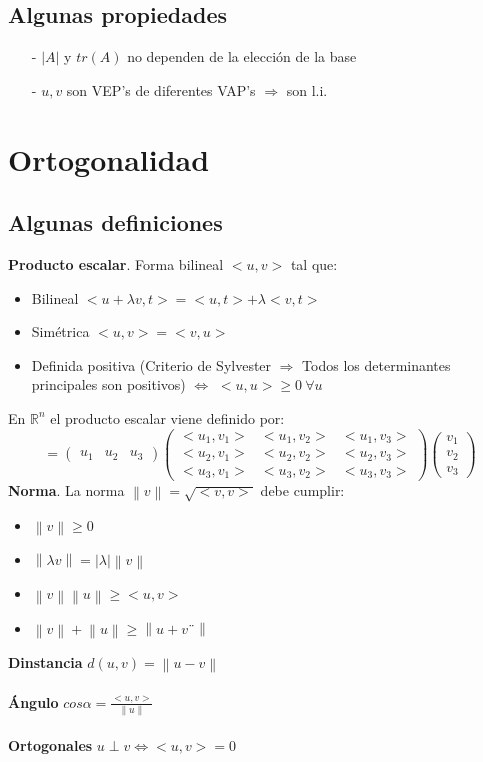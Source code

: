 \documentclass[12pt]{article}
\newcommand\norm[1]{\left\lVert#1\right\rVert}
\begin{document}
	\subsection{Algunas propiedades}
	\begin{itemize}
		\item[-] $|A|$ y $tr(A)$ no dependen de la elección de la base
		\item[-] $u, v$ son VEP's de diferentes VAP's $\Rightarrow$ son l.i.
	\end{itemize}
	
	
\section{Ortogonalidad}
	\subsection{Algunas definiciones}
	\textbf{Producto escalar}. Forma bilineal $<u, v>$ tal que:
	\begin{itemize}
		\item Bilineal $<u+\lambda v, t> = <u, t> + \lambda <v, t>$
		\item Simétrica $<u, v>=<v, u>$
		\item Definida positiva (Criterio de Sylvester $\Rightarrow$ Todos los determinantes principales son positivos) $\iff$ $<u, u> \geq 0 \ \forall u$
	\end{itemize}
	
	
	En $\mathbb{R}^n$ el producto escalar viene definido por:
	\[<u, v>= \begin{pmatrix} 
    u_1 & u_2 & u_3
	\end{pmatrix}
	\begin{pmatrix} 
	<u_1, v_1> & <u_1, v_2> & <u_1, v_3> \\
    <u_2, v_1> & <u_2, v_2> & <u_2, v_3> \\
    <u_3, v_1> & <u_3, v_2> & <u_3, v_3> 
    \end{pmatrix}
	\begin{pmatrix} 
	v_1 \\
	v_2 \\
	v_3
	\end{pmatrix}
	\]
	\textbf{Norma}. La norma $\norm{v}=\sqrt{<v, v>}$ debe cumplir:
	\begin{itemize}
		\item $\norm{v}\geq 0$
		\item $\norm{\lambda v} = |\lambda|\norm{v}$
		\item $\norm{v}\norm{u} \geq <u, v>$
		\item $\norm{v} + \norm{u} \geq \norm{u+v¨}$
	\end{itemize}
	\textbf{Dinstancia} $d(u, v)= \norm{u-v}$ \\
	\\
	\textbf{Ángulo} $cos\alpha=\frac{<u, v>}{\norm{u}}$ \\
	\\
	\textbf{Ortogonales} $u\perp v \iff <u, v> = 0$\\
	
\end{document}
